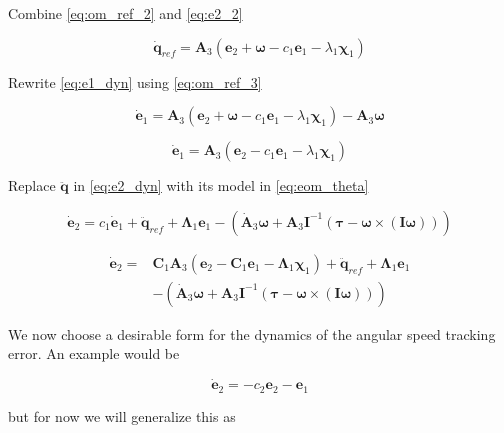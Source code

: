 Combine \eqref{eq:om_ref_2} and \eqref{eq:e2_2}

\begin{equation}
\dot{\mathbf{q}}_{ref} =
\mathbf{A}_3 \left( \mathbf{e}_2 + \boldsymbol\omega - c_1 \mathbf{e}_1 - \lambda_1 \boldsymbol\chi_1 \right)
\label{eq:om_ref_3}
\end{equation}

Rewrite \eqref{eq:e1_dyn} using \eqref{eq:om_ref_3}

\[
\dot{\mathbf{e}}_1 =
\mathbf{A}_3 \left( \mathbf{e}_2 + \boldsymbol\omega - c_1 \mathbf{e}_1 - \lambda_1 \boldsymbol\chi_1 \right) -
\mathbf{A}_3 \boldsymbol\omega
\]

\[
\dot{\mathbf{e}}_1 =
\mathbf{A}_3 \left( \mathbf{e}_2 - c_1 \mathbf{e}_1 - \lambda_1 \boldsymbol\chi_1 \right)
\]

Replace $\ddot{\mathbf{q}}$ in \eqref{eq:e2_dyn} with its model in \eqref{eq:eom_theta}

\begin{equation}
\dot{\mathbf{e}}_2 =
c_1 \dot{\mathbf{e}}_1 +
\ddot{\mathbf{q}}_{ref} +
\boldsymbol\Lambda_1 \mathbf{e}_1
- \left(
	\dot{\mathbf{A}}_3 \boldsymbol\omega
	+ \mathbf{A}_3 \mathbf{I}^{-1} \left( \boldsymbol\tau - \boldsymbol\omega \times \left( \mathbf{I} \boldsymbol\omega \right) \right)
\right)
\label{eq:}
\end{equation}


\begin{align}
\nonumber
\dot{\mathbf{e}}_2 = &
\mathbf{C}_1 \mathbf{A}_3 \left( \mathbf{e}_2 - \mathbf{C}_1 \mathbf{e}_1 - \boldsymbol\Lambda_1 \boldsymbol\chi_1 \right) +
\ddot{\mathbf{q}}_{ref} +
\boldsymbol\Lambda_1 \mathbf{e}_1 \\
&- \left(
	\dot{\mathbf{A}}_3 \boldsymbol\omega
	+ \mathbf{A}_3 \mathbf{I}^{-1} \left( \boldsymbol\tau - \boldsymbol\omega \times \left( \mathbf{I} \boldsymbol\omega \right) \right)
\right)
\label{eq:}
\end{align}

We now choose a desirable form for the dynamics of the angular speed tracking error. An example would be

\[
\dot{\mathbf{e}}_2 = -c_2 \mathbf{e}_2 - \mathbf{e}_1
\]

but for now we will generalize this as

